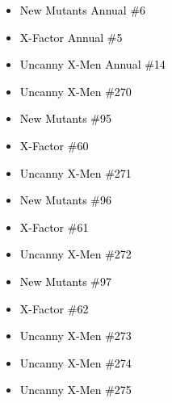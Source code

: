 \documentclass[12pt]{article}
\newcommand{\checkbox}{\raisebox{0.0ex}{\fbox{\rule{0ex}{1.5ex} \rule{1.5ex}{0ex}}}}
\begin{document}
\vspace{0.3cm}
\noindent
\begin{tcolorbox}[
  colback=white!95!gray,
  colframe=black,
  width=\textwidth,
  arc=4mm,
  auto outer arc,
  boxrule=0.8pt,
  left=8pt,right=8pt,top=8pt,bottom=8pt
]
\begin{itemize}[left=0pt,label={\checkbox}]
    \item \textcolor{black}{New Mutants Annual \#6}
    \item \textcolor{black}{X-Factor Annual \#5}
    \item \textcolor{black}{Uncanny X-Men Annual \#14}
    \item \textcolor{black}{Uncanny X-Men \#270}
    \item \textcolor{black}{New Mutants \#95}
    \item \textcolor{black}{X-Factor \#60}
    \item \textcolor{black}{Uncanny X-Men \#271}
    \item \textcolor{black}{New Mutants \#96}
    \item \textcolor{black}{X-Factor \#61}
    \item \textcolor{black}{Uncanny X-Men \#272}
    \item \textcolor{black}{New Mutants \#97}
    \item \textcolor{black}{X-Factor \#62}
    \item \textcolor{black}{Uncanny X-Men \#273}
    \item \textcolor{black}{Uncanny X-Men \#274}
    \item \textcolor{black}{Uncanny X-Men \#275}
\end{itemize}
\end{tcolorbox}

\newpage
{}
\end{document}
